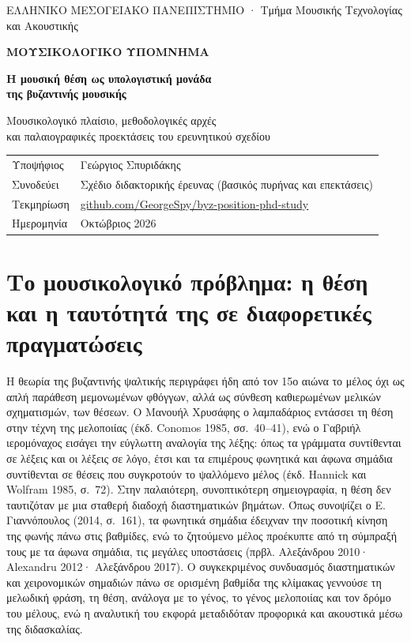 \documentclass[11pt,a4paper]{article}
\begin{document}
\begin{center}
{\small ΕΛΛΗΝΙΚΟ ΜΕΣΟΓΕΙΑΚΟ ΠΑΝΕΠΙΣΤΗΜΙΟ · Τμήμα Μουσικής Τεχνολογίας και Ακουστικής}\par\vspace{0.8cm}
{\large\bfseries ΜΟΥΣΙΚΟΛΟΓΙΚΟ ΥΠΟΜΝΗΜΑ}\par\vspace{0.4cm}
{\Large\bfseries Η μουσική θέση ως υπολογιστική μονάδα\\[2pt] της βυζαντινής μουσικής}\par\vspace{0.3cm}
{\large Μουσικολογικό πλαίσιο, μεθοδολογικές αρχές\\ και παλαιογραφικές προεκτάσεις του ερευνητικού σχεδίου}\par\vspace{0.6cm}
\begin{tabular}{@{}ll@{}}
Υποψήφιος & Γεώργιος Σπυριδάκης\\
Συνοδεύει & Σχέδιο διδακτορικής έρευνας (βασικός πυρήνας και επεκτάσεις)\\
Τεκμηρίωση & \href{https://github.com/GeorgeSpy/byz-position-phd-study}{github.com/GeorgeSpy/byz-position-phd-study}\\
Ημερομηνία & Οκτώβριος 2026\\
\end{tabular}
\end{center}
\vspace{0.4cm}

\section{Το μουσικολογικό πρόβλημα: η θέση και η ταυτότητά της σε διαφορετικές πραγματώσεις}

Η θεωρία της βυζαντινής ψαλτικής περιγράφει ήδη από τον 15ο αιώνα το μέλος όχι ως απλή παράθεση μεμονωμένων φθόγγων, αλλά ως σύνθεση καθιερωμένων μελικών σχηματισμών, των θέσεων. Ο Μανουήλ Χρυσάφης ο λαμπαδάριος εντάσσει τη θέση στην τέχνη της μελοποιίας (έκδ. Conomos 1985, σσ.~40--41), ενώ ο Γαβριήλ ιερομόναχος εισάγει την εύγλωττη αναλογία της λέξης: όπως τα γράμματα συντίθενται σε λέξεις και οι λέξεις σε λόγο, έτσι και τα επιμέρους φωνητικά και άφωνα σημάδια συντίθενται σε θέσεις που συγκροτούν το ψαλλόμενο μέλος (έκδ. Hannick και Wolfram 1985, σ.~72). Στην παλαιότερη, συνοπτικότερη σημειογραφία, η θέση δεν ταυτιζόταν με μια σταθερή διαδοχή διαστηματικών βημάτων. Όπως συνοψίζει ο Ε. Γιαννόπουλος (2014, σ.~161), τα φωνητικά σημάδια έδειχναν την ποσοτική κίνηση της φωνής πάνω στις βαθμίδες, ενώ το ζητούμενο μέλος προέκυπτε από τη σύμπραξή τους με τα άφωνα σημάδια, τις μεγάλες υποστάσεις (πρβλ. Αλεξάνδρου 2010· Alexandru 2012· Αλεξάνδρου 2017). Ο συγκεκριμένος συνδυασμός διαστηματικών και χειρονομικών σημαδιών πάνω σε ορισμένη βαθμίδα της κλίμακας γεννούσε τη μελωδική φράση, τη θέση, ανάλογα με το γένος, το γένος μελοποιίας και τον δρόμο του μέλους, ενώ η αναλυτική του εκφορά μεταδιδόταν προφορικά και ακουστικά μέσω της διδασκαλίας.
\end{document}
